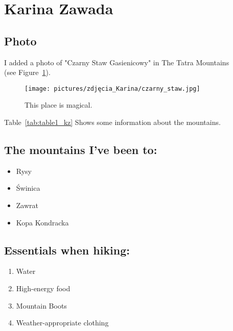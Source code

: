\setlength{\parskip}{10pt}

\section{Karina Zawada}
\label{sec:karinazawada}

\setlength{\parskip}{10pt}
\subsection{Photo}
I added a photo of "Czarny Staw Gasienicowy" in The Tatra Mountains \\(see Figure~\ref{fig:czarny_staw}).

\begin{figure}[htbp]
    \centering
    \texttt{[image: pictures/zdjęcia\_Karina/czarny\_staw.jpg]}
    \caption{This place is magical.}
    \label{fig:czarny_staw}
\end{figure}

Table~\ref{tab:table1_kz} Shows some information about the mountains.


\setlength{\parskip}{10pt}
\subsection{The mountains I've been to:}

\begin{itemize}
    \item Rysy
    \item Świnica
    \item Zawrat
    \item Kopa Kondracka
\end{itemize}

\newpage

\setlength{\parskip}{10pt}
\subsection{Essentials when hiking:}

\begin{enumerate}
    \item Water
    \item High-energy food
    \item Mountain Boots
    \item Weather-appropriate clothing
\end{enumerate}

\medskip
\medskip
\medskip

